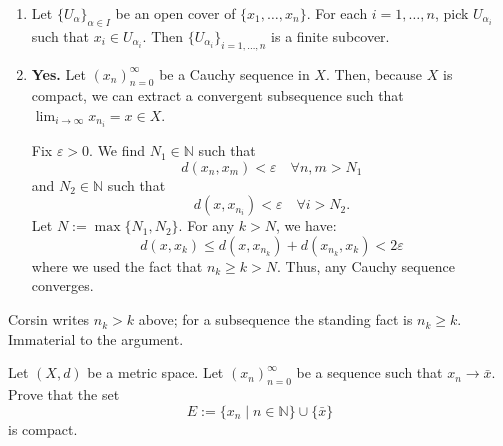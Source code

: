 \begin{exercisesolution}
\begin{enumerate}[label=\textbf{(\alph*)}]
  \item Let $\{U_\alpha\}_{\alpha \in I}$ be an open cover of $\{x_1, \dots, x_n\}$. For each
    $i = 1, \dots, n$, pick $U_{\alpha_i}$ such that $x_i \in U_{\alpha_i}$. Then
    $\{U_{\alpha_i}\}_{i=1,\dots,n}$ is a finite subcover.
  \item \textbf{Yes.} Let $(x_n)_{n=0}^{\infty}$ be a Cauchy sequence in $X$. Then, because $X$ is
    compact, we can extract a convergent subsequence such that $\lim_{i \to \infty} x_{n_i} = x \in X$.

    Fix $\varepsilon > 0$. We find $N_1 \in \mathbb{N}$ such that
    \[d(x_n, x_m) < \varepsilon \quad \forall n, m > N_1\]
    and $N_2 \in \mathbb{N}$ such that
    \[d(x, x_{n_i}) < \varepsilon \quad \forall i > N_2.\]
    Let $N := \max\{N_1, N_2\}$. For any $k > N$, we have:
    \[d(x, x_k) \leq d(x, x_{n_k}) + d(x_{n_k}, x_k) < 2\varepsilon\]
    where we used the fact that $n_k \geq k > N$. Thus, any Cauchy sequence converges.
\end{enumerate}
\end{exercisesolution}

\begin{ainote}
Corsin writes $n_k > k$ above; for a subsequence the standing fact is $n_k \geq k$. Immaterial to
the argument.
\end{ainote}

\begin{exercise}
\label{ex:convergent_sequence_compact}
Let $(X,d)$ be a metric space. Let $(x_n)_{n=0}^\infty$ be a sequence such that $x_n \to \bar{x}$. Prove that the set
\[E := \{x_n \mid n \in \mathbb{N}\} \cup \{\bar{x}\}\]
is compact.
\end{exercise}

